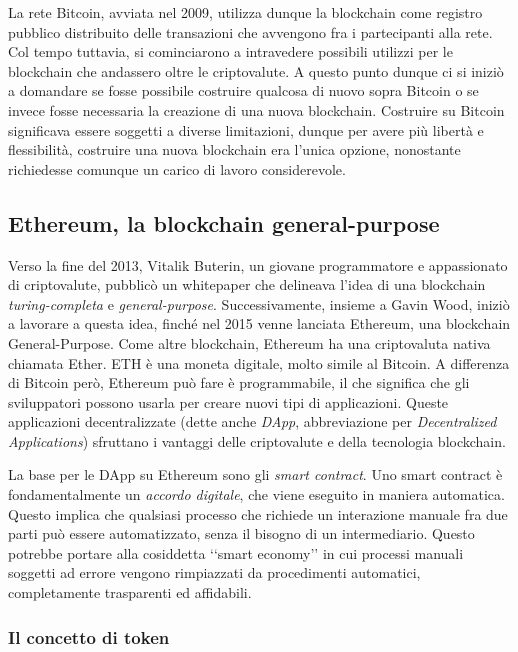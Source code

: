 La rete Bitcoin, avviata nel 2009, utilizza dunque la blockchain come registro pubblico distribuito delle transazioni che avvengono fra i partecipanti alla rete. Col tempo tuttavia, si cominciarono a intravedere possibili utilizzi per le blockchain che andassero oltre le criptovalute. A questo punto dunque ci si iniziò a domandare se fosse possibile costruire qualcosa di nuovo sopra Bitcoin o se invece fosse necessaria la creazione di una nuova blockchain. Costruire su Bitcoin significava essere soggetti a diverse limitazioni, dunque per avere più libertà e flessibilità, costruire una nuova blockchain era l'unica opzione, nonostante richiedesse comunque un carico di lavoro considerevole.

\subsection{Ethereum, la blockchain general-purpose}

Verso la fine del 2013, Vitalik Buterin, un giovane programmatore e appassionato di criptovalute, pubblicò un whitepaper\cite{K22} che delineava l'idea di una blockchain \textit{turing-completa} e \textit{general-purpose}. Successivamente, insieme a Gavin Wood, iniziò a lavorare a questa idea, finché nel 2015 venne lanciata Ethereum, una blockchain General-Purpose. Come altre blockchain, Ethereum ha una criptovaluta nativa chiamata Ether. ETH è una moneta digitale, molto simile al Bitcoin. A differenza di Bitcoin però, Ethereum può fare è programmabile, il che significa che gli sviluppatori possono usarla per creare nuovi tipi di applicazioni. Queste applicazioni decentralizzate (dette anche \textit{DApp}, abbreviazione per \textit{Decentralized Applications}) sfruttano i vantaggi delle criptovalute e della tecnologia blockchain. 

La base per le DApp su Ethereum sono gli \textit{smart contract}. Uno smart contract è fondamentalmente un \textit{accordo digitale}, che viene eseguito in maniera automatica. Questo implica che qualsiasi processo che richiede un interazione manuale fra due parti può essere automatizzato, senza il bisogno di un intermediario. Questo potrebbe portare alla cosiddetta ‘‘smart economy’’ in cui processi manuali soggetti ad errore vengono rimpiazzati da procedimenti automatici, completamente trasparenti ed affidabili. 

\subsubsection{Il concetto di token}

